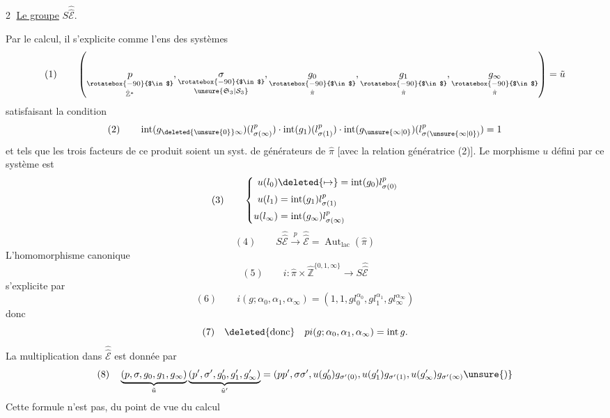 \textcircled{2} \uline{Le groupe} $S\widehat{\widehat{\mathcal E}}$.

Par le calcul, il s'explicite comme l'ens des systèmes
\[
(1)\qquad\left(\underset{\hat{\mathbb Z}^{*}}{\underset{\rotatebox{-90}{$\in$}}{p}},\underset{\unsure{\mathfrak S_3|\mathcal S_3}}{\underset{\rotatebox{-90}{$\in$}}{\sigma}},\underset{\hat\pi}{\underset{\rotatebox{-90}{$\in$}}{g_0}},\underset{\hat\pi}{\underset{\rotatebox{-90}{$\in$}}{g_1}},\underset{\hat\pi}{\underset{\rotatebox{-90}{$\in$}}{g_\infty}}\right)=\tilde u
\]
satisfaisant la condition
\[
(2)\qquad\operatorname{int}(g_{\deleted{\unsure{0}}\infty})(l_{\sigma(\infty)}^p)\cdot\operatorname{int}(g_1)(l_{\sigma(1)}^p)\cdot\operatorname{int}(g_{\unsure{\infty|0}})(l_{\sigma(\unsure{\infty|0})}^p)=1
\]
et tels que les trois facteurs de ce produit soient un syst. de générateurs de $\hat\pi$ [avec la relation génératrice (2)]. Le morphisme $u$ défini par ce  système est
\[
(3)\qquad\left\{\begin{aligned}
u(l_0)&\deleted{\mapsto}=\operatorname{int}(g_0)l_{\sigma(0)}^p\\
u(l_1)&=\operatorname{int}(g_1)l_{\sigma(1)}^p\\
u(l_\infty)&=\operatorname{int}(g_\infty)l_{\sigma(\infty)}^p
\end{aligned}\right.
\]
\[
(4)\qquad S\widehat{\widehat{\mathcal E}}\xrightarrow{p}\widehat{\widehat{\mathcal E}}=\operatorname{Aut}_{\mathrm{lac}}(\hat\pi)
\]
L'homomorphisme canonique
\[
(5)\qquad i:\hat\pi\times\hat{\mathbb Z}^{\{0,1,\infty\}}\longrightarrow S\widehat{\widehat{\mathcal E}}
\]
s'explicite par
\[
(6)\qquad i(g;\alpha_0,\alpha_1,\alpha_\infty)=(1,1,gl_0^{\alpha_0},gl_1^{\alpha_1},gl_\infty^{\alpha_\infty})
\]
donc
\[
(7)\quad\deleted{\text{donc}}\quad pi(g;\alpha_0,\alpha_1,\alpha_\infty)=\operatorname{int}g.
\]
La multiplication dans $\widehat{\widehat{\mathcal E}}$ est donnée par
\[
(8)\quad\underbrace{(p,\sigma,g_0,g_1,g_\infty)}_{\tilde u}\underbrace{(p',\sigma',g'_0,g'_1,g'_\infty)}_{\tilde u'}=(pp',\sigma\sigma',u(g'_0)g_{\sigma'(0)},u(g'_1)g_{\sigma'(1)},u(g'_\infty)g_{\sigma'(\infty)}\unsure{)}
\]
Cette formule n'est pas, du point de vue du calcul\unsure{,}
